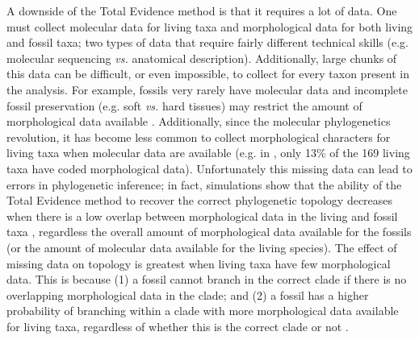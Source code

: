 A downside of the Total Evidence method is that it requires a lot of data.
One must collect molecular data for living taxa and morphological data for both living and fossil taxa; two types of data that require fairly different technical skills (e.g. molecular sequencing \textit{vs.} anatomical description).
Additionally, large chunks of this data can be difficult, or even impossible, to collect for every taxon present in the analysis.
For example, fossils very rarely have molecular data and incomplete fossil preservation (e.g. soft \textit{vs.} hard tissues) may restrict the amount of morphological data available \citep{sansomfossilization2013}.
Additionally, since the molecular phylogenetics revolution, it has become less common to collect morphological characters for living taxa when molecular data are available (e.g. in \citep{slaterphylogenetic2013}, only 13\% of the 169 living taxa have coded morphological data).
Unfortunately this missing data can lead to errors in phylogenetic inference; in fact, simulations show that the ability of the Total Evidence method to recover the correct phylogenetic topology decreases when there is a low overlap between morphological data in the living and fossil taxa \citep{GuillermeCooper}, regardless the overall amount of morphological data available for the fossils (or the amount of molecular data available for the living species).
The effect of missing data on topology is greatest when living taxa have few morphological data.
This is because (1) a fossil cannot branch in the correct clade if there is no overlapping morphological data in the clade; and (2) a fossil has a higher probability of branching within a clade with more morphological data available for living taxa, regardless of whether this is the correct clade or not \citep{GuillermeCooper}. 

